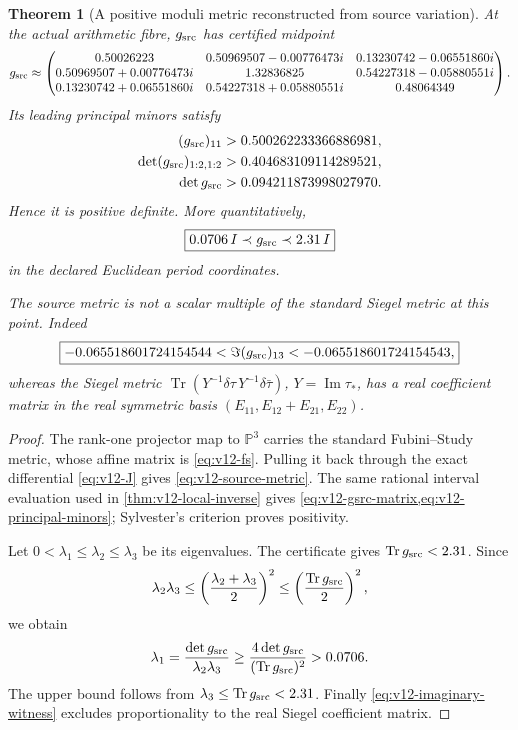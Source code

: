 \documentclass[11pt]{article}
\newtheorem{theorem}{Theorem}[section]
\theoremstyle{definition}
\theoremstyle{remark}
\begin{document}
\begin{theorem}[A positive moduli metric reconstructed from source variation]
\label{thm:v12-source-metric}
At the actual arithmetic fibre, \(g_{\rm src}\) has certified midpoint
\begin{equation}
 g_{\rm src}\approx
 \begin{pmatrix}
 0.50026223&0.50969507-0.00776473i&
 0.13230742-0.06551860i\\
 0.50969507+0.00776473i&1.32836825&
 0.54227318-0.05880551i\\
 0.13230742+0.06551860i&
 0.54227318+0.05880551i&0.48064349
 \end{pmatrix}.
 \label{eq:v12-gsrc-matrix}
\end{equation}
Its leading principal minors satisfy
\begin{align}
 (g_{\rm src})_{11}&>0.500262233366886981,\notag\\
 \det(g_{\rm src})_{1:2,1:2}&>0.404683109114289521,\notag\\
 \det g_{\rm src}&>0.094211873998027970.
 \label{eq:v12-principal-minors}
\end{align}
Hence it is positive definite.  More quantitatively,
\begin{equation}
 \boxed{
 0.0706\,I\prec g_{\rm src}\prec2.31\,I
 }
 \label{eq:v12-source-floor}
\end{equation}
in the declared Euclidean period coordinates.

The source metric is not a scalar multiple of the standard Siegel metric at
this point.  Indeed
\begin{equation}
 \boxed{
 -0.065518601724154544
 <\Im(g_{\rm src})_{13}
 <-0.065518601724154543,
 }
 \label{eq:v12-imaginary-witness}
\end{equation}
whereas the Siegel metric
\(\operatorname{Tr}(Y^{-1}\delta\tau\,Y^{-1}\delta\bar\tau)\),
\(Y=\operatorname{Im}\tau_*\), has a real coefficient matrix in the real
symmetric basis
\((E_{11},E_{12}+E_{21},E_{22})\).
\end{theorem}
\begin{proof}
The rank-one projector map to \(\mathbb P^3\) carries the standard
Fubini--Study metric, whose affine matrix is \cref{eq:v12-fs}.  Pulling it back
through the exact differential \cref{eq:v12-J} gives
\cref{eq:v12-source-metric}.  The same rational interval evaluation used in
\cref{thm:v12-local-inverse} gives
\cref{eq:v12-gsrc-matrix,eq:v12-principal-minors}; Sylvester's criterion proves
positivity.

Let \(0<\lambda_1\le\lambda_2\le\lambda_3\) be its eigenvalues.  The
certificate gives
\(\operatorname{Tr}g_{\rm src}<2.31\).  Since
\[
 \lambda_2\lambda_3
 \le\left(\frac{\lambda_2+\lambda_3}{2}\right)^2
 \le\left(\frac{\operatorname{Tr}g_{\rm src}}2\right)^2,
\]
we obtain
\[
 \lambda_1
 =\frac{\det g_{\rm src}}{\lambda_2\lambda_3}
 \ge\frac{4\det g_{\rm src}}{(\operatorname{Tr}g_{\rm src})^2}
 >0.0706.
\]
The upper bound follows from \(\lambda_3\le\operatorname{Tr}g_{\rm src}<2.31\).
Finally \cref{eq:v12-imaginary-witness} excludes proportionality to the real
Siegel coefficient matrix.
\end{proof}
\end{document}
